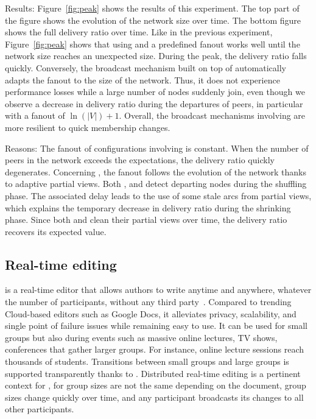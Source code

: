 \begin{asparadesc}
\item [Results:] Figure~\ref{fig:peak} shows the results of this
  experiment. The top part of the figure shows the evolution of the
  network size over time. The bottom figure shows the full delivery
  ratio over time. Like in the previous experiment,
  Figure~\ref{fig:peak} shows that using \CYCLON and a predefined
  fanout works well until the network size reaches an unexpected
  size. During the peak, the delivery ratio falls quickly. Conversely,
  the broadcast mechanism built on top of \SPRAY automatically adapts
  the fanout to the size of the network. Thus, it does not experience
  performance losses while a large number of nodes suddenly join, even
  though we observe a decrease in delivery ratio during the departures
  of peers, in particular with a fanout of $\ln(|V|)+1$. Overall, the
  broadcast mechanisms involving \SPRAY are more resilient to quick
  membership changes.
\item [Reasons:] The fanout of configurations involving \CYCLON is
  constant. When the number of peers in the network exceeds the
  expectations, the delivery ratio quickly degenerates. Concerning
  \SPRAY, the fanout follows the evolution of the network thanks to
  adaptive partial views. Both \SPRAY, and \CYCLON detect departing
  nodes during the shuffling phase. The associated delay leads to the
  use of some stale arcs from partial views, which explains the
  temporary decrease in delivery ratio during the shrinking
  phase. Since both \CYCLON and \SPRAY clean their partial views over
  time, the delivery ratio recovers its expected value.
\end{asparadesc}


\subsection{Real-time editing}
\label{sec:use-case}

\CRATE is a real-time editor that allows authors to write anytime and anywhere,
whatever the number of participants, without any third
party~\cite{nedelec2016crate}. Compared to trending Cloud-based editors such as
Google Docs, it alleviates privacy, scalability, and single point of failure
issues while remaining easy to use.  It can be used for small groups but also
during events such as massive online lectures, TV shows, conferences that gather
larger groups. For instance, online lecture sessions reach thousands of
students. Transitions between small groups and large groups is supported
transparently thanks to \SPRAY. Distributed real-time editing is a pertinent
context for \SPRAY, for group sizes are not the same depending on the document,
group sizes change quickly over time, and any participant broadcasts its changes
to all other participants.

